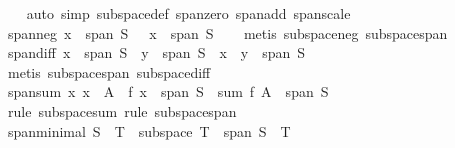 \begin{isabellebody}
%
\isadelimproof
\ \ %
\endisadelimproof
%
\isatagproof
{}\isamarkupfalse%
\ {\isacharparenleft}{\kern0pt}auto\ simp{\isacharcolon}{\kern0pt}\ subspace{\isacharunderscore}{\kern0pt}def\ span{\isacharunderscore}{\kern0pt}zero\ span{\isacharunderscore}{\kern0pt}add\ span{\isacharunderscore}{\kern0pt}scale{\isacharparenright}{\kern0pt}%
\endisatagproof
{\isafoldproof}%
%
\isadelimproof
\isanewline
%
\endisadelimproof
\isanewline
{}\isamarkupfalse%
\ span{\isacharunderscore}{\kern0pt}neg{\isacharcolon}{\kern0pt}\ {\isachardoublequoteopen}x\ {\isasymin}\ span\ S\ {\isasymLongrightarrow}\ {\isacharminus}{\kern0pt}\ x\ {\isasymin}\ span\ S{\isachardoublequoteclose}\isanewline
%
\isadelimproof
\ \ %
\endisadelimproof
%
\isatagproof
{}\isamarkupfalse%
\ {\isacharparenleft}{\kern0pt}metis\ subspace{\isacharunderscore}{\kern0pt}neg\ subspace{\isacharunderscore}{\kern0pt}span{\isacharparenright}{\kern0pt}%
\endisatagproof
{\isafoldproof}%
%
\isadelimproof
\isanewline
%
\endisadelimproof
\isanewline
{}\isamarkupfalse%
\ span{\isacharunderscore}{\kern0pt}diff{\isacharcolon}{\kern0pt}\ {\isachardoublequoteopen}x\ {\isasymin}\ span\ S\ {\isasymLongrightarrow}\ y\ {\isasymin}\ span\ S\ {\isasymLongrightarrow}\ x\ {\isacharminus}{\kern0pt}\ y\ {\isasymin}\ span\ S{\isachardoublequoteclose}\isanewline
%
\isadelimproof
\ \ %
\endisadelimproof
%
\isatagproof
{}\isamarkupfalse%
\ {\isacharparenleft}{\kern0pt}metis\ subspace{\isacharunderscore}{\kern0pt}span\ subspace{\isacharunderscore}{\kern0pt}diff{\isacharparenright}{\kern0pt}%
\endisatagproof
{\isafoldproof}%
%
\isadelimproof
\isanewline
%
\endisadelimproof
\isanewline
{}\isamarkupfalse%
\ span{\isacharunderscore}{\kern0pt}sum{\isacharcolon}{\kern0pt}\ {\isachardoublequoteopen}{\isacharparenleft}{\kern0pt}{\isasymAnd}x{\isachardot}{\kern0pt}\ x\ {\isasymin}\ A\ {\isasymLongrightarrow}\ f\ x\ {\isasymin}\ span\ S{\isacharparenright}{\kern0pt}\ {\isasymLongrightarrow}\ sum\ f\ A\ {\isasymin}\ span\ S{\isachardoublequoteclose}\isanewline
%
\isadelimproof
\ \ %
\endisadelimproof
%
\isatagproof
{}\isamarkupfalse%
\ {\isacharparenleft}{\kern0pt}rule\ subspace{\isacharunderscore}{\kern0pt}sum{\isacharcomma}{\kern0pt}\ rule\ subspace{\isacharunderscore}{\kern0pt}span{\isacharparenright}{\kern0pt}%
\endisatagproof
{\isafoldproof}%
%
\isadelimproof
\isanewline
%
\endisadelimproof
\isanewline
{}\isamarkupfalse%
\ span{\isacharunderscore}{\kern0pt}minimal{\isacharcolon}{\kern0pt}\ {\isachardoublequoteopen}S\ {\isasymsubseteq}\ T\ {\isasymLongrightarrow}\ subspace\ T\ {\isasymLongrightarrow}\ span\ S\ {\isasymsubseteq}\ T{\isachardoublequoteclose}\isanewline

\end{isabellebody}
